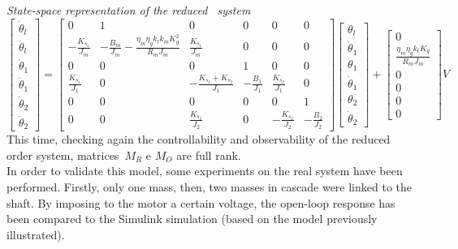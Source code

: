 \noindent \textit{State-space representation of the reduced \twodof\ system}
\begin{equation}
	\begin{bmatrix}
		\dot{\theta}_l \\
		\ddot{\theta}_l \\
		\dot{\theta}_1 \\
		\ddot{\theta}_1 \\
		\dot{\theta}_2 \\
		\ddot{\theta}_2
	\end{bmatrix}
	=
	\begin{bmatrix}
		0 &1 & 0 & 0 & 0 & 0 \\
		-\frac{K_{s_1}}{J_m} & -\frac{B_m}{J_m}-\frac{\eta_m \eta_g k_t k_m K^2_g}{R_m J_m}  & \frac{K_{s_1}}{J_m} & 0 & 0 & 0 \\
		0 & 0 & 0 & 1 & 0 & 0 \\
		\frac{K_{s_1}}{J_1} & 0 & -\frac{K_{s_1}+K_{s_2}}{J_1} & -\frac{B_1}{J_1} & \frac{K_{s_2}}{J_1} & 0 \\
		0 & 0 & 0 & 0 & 0 & 1 \\
		0 & 0 & \frac{K_{s_2}}{J_2} & 0 & -\frac{K_{s_2}}{J_2} & -\frac{B_2}{J_2}
	\end{bmatrix}
	\begin{bmatrix}
		\theta_l \\
		\dot{\theta}_1 \\
		\theta_1 \\
		\dot{\theta}_1 \\
		\theta_2 \\
		\dot{\theta}_2
	\end{bmatrix}
	+
	\begin{bmatrix}
		0 \\
		\frac{\eta_m \eta_g k_t K_g}{R_m J_m} \\
		0 \\
		0 \\
		0 \\
		0
	\end{bmatrix}
	V
\end{equation}
This time, checking again the controllability and observability of the reduced order system, matrices~$M_R$ e $M_O$ are full rank. \\

In order to validate this model, some experiments on the real system have been performed. Firstly, only one mass, then, two masses in cascade were linked to the shaft. By imposing to the motor a certain voltage, the open-loop response has been compared to the Simulink simulation (based on the model previously illustrated).

